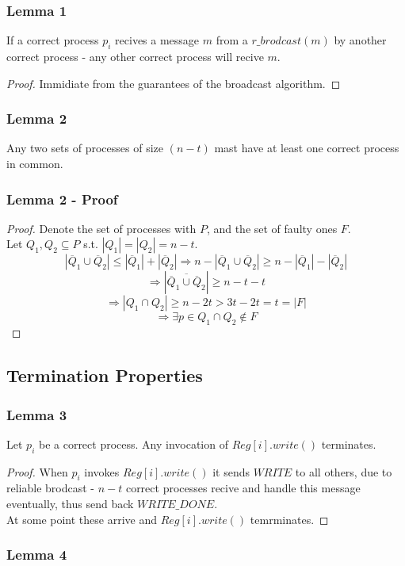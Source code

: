 \begin{frame}
    \frametitle{Lemma 1}
    \begin{lemma}
        If a correct process $p_i$ recives a message $m$ from a $r\_brodcast(m)$ by another correct process - 
        any other correct process will recive $m$.\\
    \end{lemma}

    \begin{proof}
        Immidiate from the guarantees of the broadcast algorithm.
    \end{proof}

\end{frame}
\begin{frame}
    \frametitle{Lemma 2}
    \begin{lemma}
        Any two sets of processes of size $(n-t)$ mast have
        at least one correct process in common.
    \end{lemma}
\end{frame}
\begin{frame}
    \frametitle{Lemma 2 - Proof}
    \begin{proof}
        Denote the set of processes with $P$, and the set of faulty ones $F$.\\
        Let $Q_1,Q_2\subseteq P$ s.t. $|Q_1|=|Q_2|=n-t$.\\
        \[
            |\overline{Q}_1\cup\overline{Q}_2|\leq |\overline{Q}_1|+|\overline{Q}_2|
            \Rightarrow n-|\overline{Q}_1\cup\overline{Q}_2|\geq n-|\overline{Q}_1|-|\overline{Q}_2|
        \]\[
            \Rightarrow |\overline{\overline{Q}_1\cup\overline{Q}_2}|\geq n-t-t
        \]\[
            \Rightarrow |Q_1\cap Q_2|\geq n-2t>3t-2t=t=|F|
        \]\[
            \Rightarrow \exists p\in Q_1\cap Q_2\notin F
        \]
    \end{proof}
\end{frame}

\subsection{Termination Properties}
\begin{frame}
    \frametitle{Lemma 3}
    \begin{lemma}
        Let $p_i$ be a correct process. Any invocation of $Reg[i].write()$ terminates.
    \end{lemma}
    \begin{proof}
        When $p_i$ invokes $Reg[i].write()$ it sends $WRITE$ to all others,
        due to reliable brodcast - $n-t$ correct processes recive and handle this message
        eventually, thus send back $WRITE\_DONE$.\\
        At some point these arrive and $Reg[i].write()$ temrminates.
    \end{proof}
\end{frame}
\begin{frame}
    \frametitle{Lemma 4}
    \begin{lemma}
    \end{lemma}
\end{frame}

